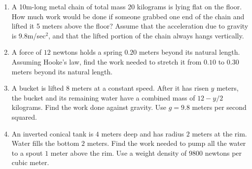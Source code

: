 \documentclass{article}
\begin{document}
\begin{enumerate}
 \item A 10m-long metal chain of total mass 20 kilograms is lying flat on the floor. How much work would be done if someone grabbed one end of the chain and lifted it 5 meters above the floor? Assume that the acceleration due to gravity is  9.8m/sec$^2$, and that the lifted portion of the chain always hangs vertically.
\item A force of $12$ newtons holds a spring $0.20$ meters beyond its natural length. Assuming Hooke's law, find the work needed to stretch it from $0.10$ to $0.30$ meters beyond its natural length.
\item A bucket is lifted $8$ meters at a constant speed. After it has risen $y$ meters, the bucket and its remaining water have a combined mass of $12-y/2$ kilograms. Find the work done against gravity. Use $g=9.8$ meters per second squared.
\item An inverted conical tank is $4$ meters deep and has radius $2$ meters at the rim. Water fills the bottom $2$ meters. Find the work needed to pump all the water to a spout $1$ meter above the rim. Use a weight density of $9800$ newtons per cubic meter.
\end{enumerate}
\end{document}
